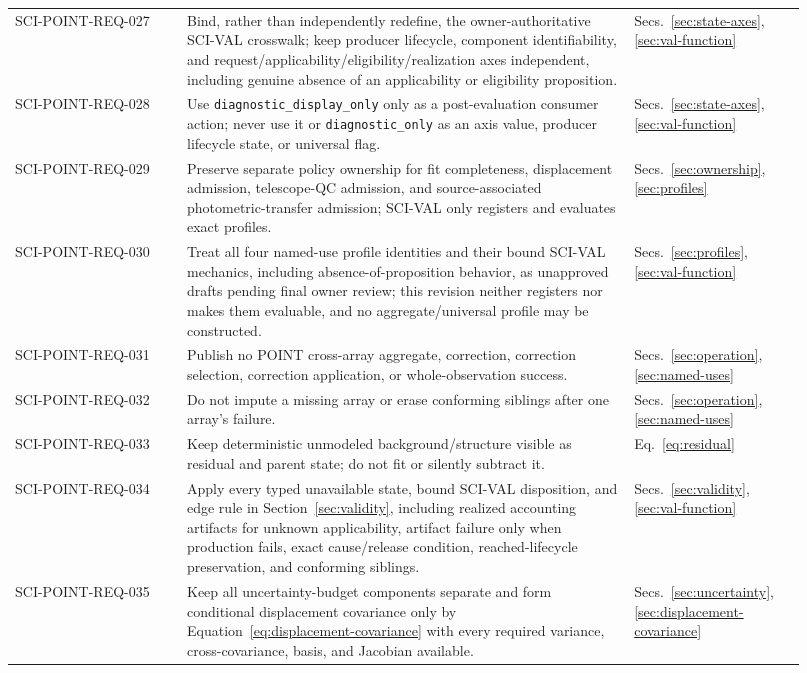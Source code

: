 \begin{longtable}{@{}p{0.20\linewidth}p{0.52\linewidth}p{0.20\linewidth}@{}}
SCI-POINT-REQ-027 & Bind, rather than independently redefine, the owner-authoritative SCI-VAL crosswalk; keep producer lifecycle, component identifiability, and request/applicability/eligibility/realization axes independent, including genuine absence of an applicability or eligibility proposition. & Secs.~\ref{sec:state-axes}, \ref{sec:val-function} \\
SCI-POINT-REQ-028 & Use \texttt{diagnostic\_display\_only} only as a post-evaluation consumer action; never use it or \texttt{diagnostic\_only} as an axis value, producer lifecycle state, or universal flag. & Secs.~\ref{sec:state-axes}, \ref{sec:val-function} \\
SCI-POINT-REQ-029 & Preserve separate policy ownership for fit completeness, displacement admission, telescope-QC admission, and source-associated photometric-transfer admission; SCI-VAL only registers and evaluates exact profiles. & Secs.~\ref{sec:ownership}, \ref{sec:profiles} \\
SCI-POINT-REQ-030 & Treat all four named-use profile identities and their bound SCI-VAL mechanics, including absence-of-proposition behavior, as unapproved drafts pending final owner review; this revision neither registers nor makes them evaluable, and no aggregate/universal profile may be constructed. & Secs.~\ref{sec:profiles}, \ref{sec:val-function} \\
SCI-POINT-REQ-031 & Publish no POINT cross-array aggregate, correction, correction selection, correction application, or whole-observation success. & Secs.~\ref{sec:operation}, \ref{sec:named-uses} \\
SCI-POINT-REQ-032 & Do not impute a missing array or erase conforming siblings after one array's failure. & Secs.~\ref{sec:operation}, \ref{sec:named-uses} \\
SCI-POINT-REQ-033 & Keep deterministic unmodeled background/structure visible as residual and parent state; do not fit or silently subtract it. & Eq.~\ref{eq:residual} \\
SCI-POINT-REQ-034 & Apply every typed unavailable state, bound SCI-VAL disposition, and edge rule in Section~\ref{sec:validity}, including realized accounting artifacts for unknown applicability, artifact failure only when production fails, exact cause/release condition, reached-lifecycle preservation, and conforming siblings. & Secs.~\ref{sec:validity}, \ref{sec:val-function} \\
SCI-POINT-REQ-035 & Keep all uncertainty-budget components separate and form conditional displacement covariance only by Equation~\ref{eq:displacement-covariance} with every required variance, cross-covariance, basis, and Jacobian available. & Secs.~\ref{sec:uncertainty}, \ref{sec:displacement-covariance} \\

\end{longtable}
